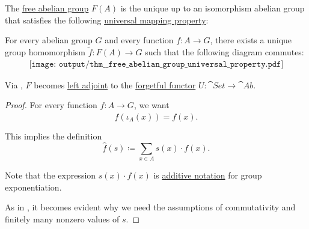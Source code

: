 \begin{proposition}\label{thm:free_abelian_group_universal_property}
  The \hyperref[def:free_abelian_group]{free abelian group} \( F(A) \) is the unique up to an isomorphism abelian group that satisfies the following \hyperref[rem:universal_mapping_property]{universal mapping property}:
  \begin{displayquote}
    For every abelian group \( G \) and every function \( f: A \to G \), there exists a unique group homomorphism \( \widetilde{f}: F(A) \to G \) such that the following diagram commutes:
    \begin{equation}\label{eq:thm:free_abelian_group_universal_property/diagram}
      \begin{aligned}
        \texttt{[image: output/thm\_\_free\_abelian\_group\_universal\_property.pdf]}
      \end{aligned}
    \end{equation}
  \end{displayquote}

  Via , \( F \) becomes \hyperref[def:category_adjunction]{left adjoint} to the \hyperref[def:concrete_category]{forgetful functor} \( U: \cat{Set} \to \cat{Ab} \).
\end{proposition}
\begin{proof}
  For every function \( f: A \to G \), we want
  \begin{equation*}
    \widehat{f}(\iota_A(x)) = f(x).
  \end{equation*}

  This implies the definition
  \begin{equation*}
    \widehat{f}(s) \coloneqq \sum_{x \in A} s(x) \cdot f(x).
  \end{equation*}

  Note that the expression \( s(x) \cdot f(x) \) is \hyperref[rem:additive_magma/multiplication]{additive notation} for group exponentiation.

  As in , it becomes evident why we need the assumptions of commutativity and finitely many nonzero values of \( s \).
\end{proof}
